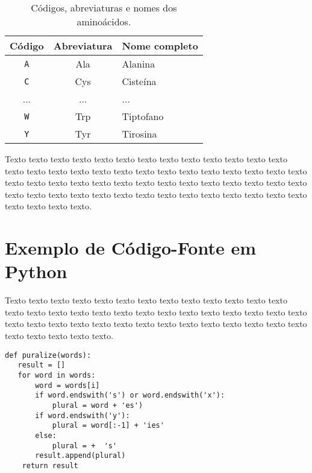 \begin{table}[!t]
\begin{center}
    \begin{tabular}{c|c|l}
	 \hline
	 Código & Abreviatura & Nome completo \\ \hline
     \texttt{A} & Ala & Alanina \\
     \texttt{C} & Cys & Cisteína \\
     ...        & ... & ... \\
     \texttt{W} & Trp & Tiptofano \\
     \texttt{Y} & Tyr & Tirosina \\ \hline
    \end{tabular}
  \caption{Códigos, abreviaturas e nomes dos aminoácidos.}
  \label{tab:amino_acidos}
\end{center}
\end{table}

Texto texto texto texto texto texto texto texto texto texto texto texto texto
texto texto texto texto texto texto texto texto texto texto texto texto texto
texto texto texto texto texto texto texto texto texto texto texto texto texto
texto texto texto texto texto texto texto texto texto texto texto texto texto
texto texto texto texto texto texto texto.


\section{Exemplo de Código-Fonte em Python}
\label{sec:exemplo_codigo_fonte}
Texto texto texto texto texto texto texto texto texto texto texto texto texto
texto texto texto texto texto texto texto texto texto texto texto texto texto
texto texto texto texto texto texto texto texto texto texto texto texto texto
texto texto texto texto texto texto texto.


\begin{lstlisting}[frame=trbl]
   def puralize(words):
   result = []
   for word in words:
       word = words[i]
       if word.endswith('s') or word.endswith('x'):
           plural = word + 'es')
       if word.endswith('y'):
           plural = word[:-1] + 'ies'
       else:
           plural = +  's'
       result.append(plural)
    return result
\end{lstlisting}


